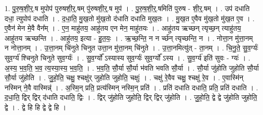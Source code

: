 \documentclass[17pt]{extarticle}
\begin{document}
1. पु॒रु॒ष॒शी॒र्॒.ष मुपोप॑ पुरुषशी॒र्॒.षम् पु॑रुषशी॒र्॒.ष मुप॑ । . पु॒रु॒ष॒शी॒र्॒.षमिति॑ पुरुष - शी॒र्॒.षम् । . उप॑ दधाति दधा॒ त्युपोप॑ दधाति । . द॒धा॒ति॒ मु॒ख॒तो मु॑ख॒तो द॑धाति दधाति मुख॒तः । . मु॒ख॒त ए॒वैव मु॑ख॒तो मु॑ख॒त ए॒व । . ए॒वैन॑ मेन मे॒वै वैन᳚म् । . ए॒न॒ माहु॑तय॒ आहु॑तय एन मेन॒ माहु॑तयः । . आहु॑तय ऋच्छन् त्यृच्छ॒न् त्याहु॑तय॒ आहु॑तय ऋच्छन्ति । . आहु॑तय॒ इत्या - हु॒त॒यः॒ । . ऋ॒च्छ॒न्ति॒ न न र्च्छ॑न् त्यृच्छन्ति॒ न । . नोत्ता॒न मु॑त्ता॒नम् न नोत्ता॒नम् । . उ॒त्ता॒नम् चि॑नुते चिनुत उत्ता॒न मु॑त्ता॒नम् चि॑नुते । . उ॒त्ता॒नमित्यु॑त् - ता॒नम् । . चि॒नु॒ते॒ सु॒व॒र्ग्यः॑ सुव॒र्ग्य॑ श्चिनुते चिनुते सुव॒र्ग्यः॑ । . सु॒व॒र्ग्यो᳚ ऽस्यास्य सुव॒र्ग्यः॑ सुव॒र्ग्यो᳚ ऽस्य । . सु॒व॒र्ग्य॑ इति॑ सुवः - ग्यः॑ । . अ॒स्य॒ भ॒व॒ति॒ भ॒व॒ त्य॒स्या॒स्य॒ भ॒व॒ति॒ । . भ॒व॒ति॒ सौ॒र्या सौ॒र्या भ॑वति भवति सौ॒र्या । . सौ॒र्या जु॑होति जुहोति सौ॒र्या सौ॒र्या जु॑होति । . जु॒हो॒ति॒ चक्षु॒ श्चक्षु॑र् जुहोति जुहोति॒ चक्षुः॑ । . चक्षु॑ रे॒वैव चक्षु॒ श्चक्षु॑ रे॒व । . ए॒वास्मि॑न् नस्मिन् ने॒वै वास्मिन्न्॑ । . अ॒स्मि॒न् प्रति॒ प्रत्य॑स्मिन् नस्मि॒न् प्रति॑ । . प्रति॑ दधाति दधाति॒ प्रति॒ प्रति॑ दधाति । . द॒धा॒ति॒ द्विर् द्विर् द॑धाति दधाति॒ द्विः । . द्विर् जु॑होति जुहोति॒ द्विर् द्विर् जु॑होति । . जु॒हो॒ति॒ द्वे द्वे जु॑होति जुहोति॒ द्वे । . द्वे हि हि द्वे द्वे हि । \newline
\end{document}
